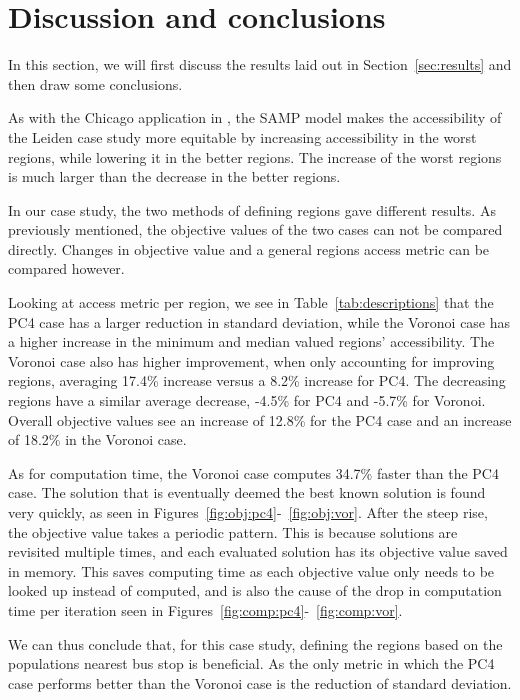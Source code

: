 \chapter{Discussion and conclusions}\label{sec:discussion}
In this section, we will first discuss the results laid out in Section~\ref{sec:results} and then draw some conclusions.

As with the Chicago application in \cite{rumpf}, the SAMP model makes the accessibility of the Leiden case study more equitable by increasing accessibility in the worst regions, while lowering it in the better regions. The increase of the worst regions is much larger than the decrease in the better regions.

In our case study, the two methods of defining regions gave different results. As previously mentioned, the objective values of the two cases can not be compared directly. Changes in objective value and a general regions access metric can be compared however.

Looking at access metric per region, we see in Table~\ref{tab:descriptions} that the PC4 case has a larger reduction in standard deviation, while the Voronoi case has a higher increase in the minimum and median valued regions' accessibility. The Voronoi case also has higher improvement, when only accounting for improving regions, averaging 17.4\% increase versus a 8.2\% increase for PC4. The decreasing regions have a similar average decrease, -4.5\% for PC4 and -5.7\% for Voronoi. Overall objective values see an increase of 12.8\% for the PC4 case and an increase of 18.2\% in the Voronoi case.

As for computation time, the Voronoi case computes 34.7\% faster than the PC4 case. The solution that is eventually deemed the best known solution is found very quickly, as seen in Figures~\ref{fig:obj:pc4}-~\ref{fig:obj:vor}. After the steep rise, the objective value takes a periodic pattern. This is because solutions are revisited multiple times, and each evaluated solution has its objective value saved in memory. This saves computing time as each objective value only needs to be looked up instead of computed, and is also the cause of the drop in computation time per iteration seen in Figures~\ref{fig:comp:pc4}-~\ref{fig:comp:vor}.

We can thus conclude that, for this case study, defining the regions based on the populations nearest bus stop is beneficial. As the only metric in which the PC4 case performs better than the Voronoi case is the reduction of standard deviation.

